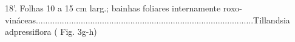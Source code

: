 \begin{customList1}
\begin{customList1}
\begin{customList1}
\begin{customList1}
\item \par{}18'.\allowbreak{} Folhas 10 a 15 cm larg.\allowbreak{}; bainhas foliares internamente roxo-\allowbreak{}vináceas.\allowbreak{}.\allowbreak{}.\allowbreak{}.\allowbreak{}.\allowbreak{}.\allowbreak{}.\allowbreak{}.\allowbreak{}.\allowbreak{}.\allowbreak{}.\allowbreak{}.\allowbreak{}.\allowbreak{}.\allowbreak{}.\allowbreak{}.\allowbreak{}.\allowbreak{}.\allowbreak{}.\allowbreak{}.\allowbreak{}.\allowbreak{}.\allowbreak{}.\allowbreak{}.\allowbreak{}.\allowbreak{}.\allowbreak{}.\allowbreak{}.\allowbreak{}.\allowbreak{}.\allowbreak{}.\allowbreak{}.\allowbreak{}.\allowbreak{}.\allowbreak{}.\allowbreak{}.\allowbreak{}.\allowbreak{}.\allowbreak{}.\allowbreak{}.\allowbreak{}.\allowbreak{}.\allowbreak{}.\allowbreak{}.\allowbreak{}.\allowbreak{}.\allowbreak{}.\allowbreak{}.\allowbreak{}.\allowbreak{}.\allowbreak{}.\allowbreak{}.\allowbreak{}.\allowbreak{}.\allowbreak{}.\allowbreak{}.\allowbreak{}.\allowbreak{}.\allowbreak{}.\allowbreak{}.\allowbreak{}.\allowbreak{}.\allowbreak{}.\allowbreak{}.\allowbreak{}.\allowbreak{}.\allowbreak{}.\allowbreak{}.\allowbreak{}.\allowbreak{}.\allowbreak{}.\allowbreak{}.\allowbreak{}.\allowbreak{}.\allowbreak{}.\allowbreak{}.\allowbreak{}.\allowbreak{}.\allowbreak{}.\allowbreak{}.\allowbreak{}.\allowbreak{}.\allowbreak{}.\allowbreak{}.\allowbreak{}.\allowbreak{}.\allowbreak{}.\allowbreak{}.\allowbreak{}.\allowbreak{}.\allowbreak{}.\allowbreak{}.\allowbreak{}Tillandsia adpressiflora (\allowbreak{} Fig.\allowbreak{} 3g-\allowbreak{}h)\allowbreak{}
\end{customList1}

\end{customList1}

\end{customList1}

\end{customList1}
